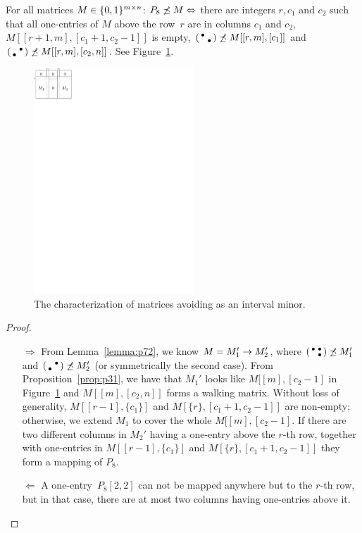 \begin{prop}
\label{prop:p72}
For all matrices $M\in\{0,1\}^{m\times n}$: $P_8\not\preceq M\Leftrightarrow$ there are integers $r,c_1$ and $c_2$ such that all one-entries of $M$ above the row~$r$ are in columns $c_1$ and $c_2$, $M[[r+1,m],[c_1+1,c_2-1]]$ is empty, $\left(\begin{smallmatrix}\bullet& \\ &\bullet\end{smallmatrix}\right)\not\preceq M[[r,m],[c_1]]$ and $\left(\begin{smallmatrix} &\bullet\\\bullet& \end{smallmatrix}\right)\not\preceq M[[r,m],[c_2,n]]$. See Figure~\ref{fig:p72}.
\end{prop}
\begin{figure}[!ht]
\centering
\includegraphics[width=60mm]{img/p72.pdf}
\caption{The characterization of matrices avoiding \usebox{\smlmatc} as an interval minor.}
\label{fig:p72}
\end{figure}
\begin{proof}
\begin{itemize}
	\item[$\Rightarrow$] From Lemma~\ref{lemma:p72}, we know $M=M_1'\rightarrow M_2'$, where $\left(\begin{smallmatrix}\bullet&\bullet\\ &\bullet\end{smallmatrix}\right)\not\preceq M_1'$ and $\left(\begin{smallmatrix} &\bullet\\\bullet& \end{smallmatrix}\right)\not\preceq M_2'$ (or symmetrically the second case). From Proposition~\ref{prop:p31}, we have that $M_1'$ looks like $M[[m],[c_2-1]$ in Figure~\ref{fig:p72} and $M[[m],[c_2,n]]$ forms a walking matrix. Without loss of generality, $M[[r-1],\{c_1\}]$ and $M[\{r\},[c_1+1,c_2-1]]$ are non-empty; otherwise, we extend $M_1$ to cover the whole $M[[m],[c_2-1]$. If there are two different columns in $M_2'$ having a one-entry above the $r$-th row, together with one-entries in $M[[r-1],\{c_1\}]$ and $M[\{r\},[c_1+1,c_2-1]]$ they form a mapping of $P_8$.
	\item[$\Leftarrow$] A one-entry~$P_8[2,2]$ can not be mapped anywhere but to the $r$-th row, but in that case, there are at most two columns having one-entries above it. \qedhere
\end{itemize}
\end{proof}


